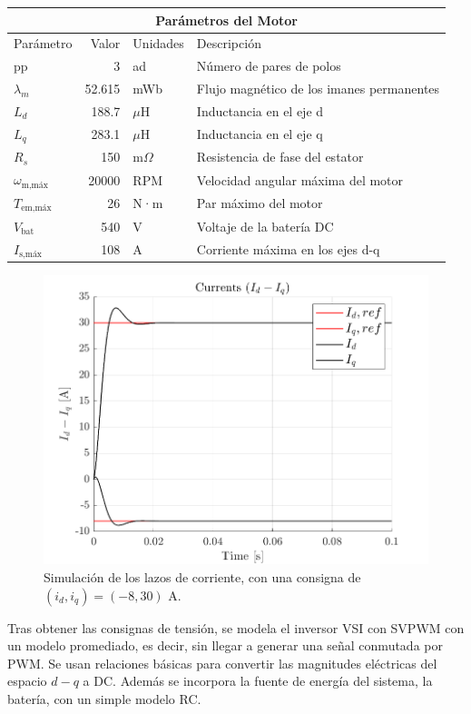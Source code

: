 \begin{tabular}{|p{2cm}||r|p{1.5cm}|p{8cm}|}
	\hline
	\multicolumn{4}{|c|}{Parámetros del Motor} \\
	\hline
	Parámetro & Valor & Unidades & Descripción \\
	\hline
	pp & 3 & ad & Número de pares de polos \\
	$\lambda_m$ & 52.615 & mWb & Flujo magnético de los imanes permanentes \\
	$L_d$ & 188.7 & $\mu$H & Inductancia en el eje d \\
	$L_q$ & 283.1 & $\mu$H & Inductancia en el eje q \\
	$R_s$ & 150 & m$\Omega$ & Resistencia de fase del estator \\
	$\omega_{\text{m,máx}}$ & 20000 & RPM & Velocidad angular máxima del motor \\
	$T_{\text{em,máx}}$ & 26 & N·m & Par máximo del motor \\
	$V_{\text{bat}}$ & 540 & V & Voltaje de la batería DC \\
	$I_{\text{s,máx}}$ & 108 & A & Corriente máxima en los ejes d-q \\
	\hline
\end{tabular}



\begin{figure}[H]
    \centering
    \includegraphics[width=0.75\linewidth]{fig/idiq_plot_PI.png}
    \caption{Simulación de los lazos de corriente, con una consigna de $(i_d, i_q) = (-8, 30) \text{ A}$.}
\end{figure}


Tras obtener las consignas de tensión, se modela el inversor VSI con SVPWM con un modelo promediado, es decir, sin llegar a generar una señal conmutada por PWM. Se usan relaciones básicas para convertir las magnitudes eléctricas del espacio $d-q$ a DC. Además se incorpora la fuente de energía del sistema, la batería, con un simple modelo RC.


